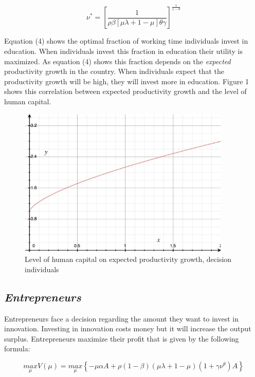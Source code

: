 \documentclass[a4paper,11pt]{article} %
\begin{document}
\begin{equation}
  \nu^{*}=\left[
    \frac{1}{\rho\beta
      \left[\mu\lambda+1-\mu\right]
    \theta\gamma}
  \right]^{\frac{1}{1-\theta}}
\end{equation}

Equation (4) shows the optimal fraction of working time individuals invest in education. When individuals invest this fraction in education their utility is maximized. As equation (4) shows this fraction depends on the \textit{expected} productivity growth in the country. When individuals expect that the productivity growth will be high, they will invest more in education. Figure 1 shows this correlation between expected productivity growth and the level of human capital.

\begin{figure}
  \centering
  \includegraphics[width=0.9\textwidth]{figure1.png}
  \caption{Level of human capital on expected productivity growth, decision individuals}
\end{figure}

\subsection*{\textit{Entrepreneurs}}
Entrepreneurs face a decision regarding the amount they want to invest in innovation. Investing in innovation costs money but it will increase the output surplus. Entrepreneurs maximize their profit that is given by the following formula:

\begin{equation}
\underset{\mu}{max}V(\mu)=
\underset{\mu}{max}
  \left\{-\mu\alpha A+\rho\left(1-\beta\right)\left(\mu\lambda+1-\mu\right)\left(1+\gamma\nu^{\theta}\right)A\right\}
\end{equation}
\end{document}
